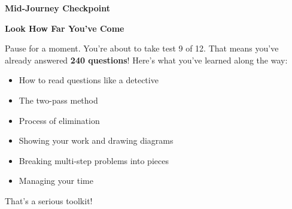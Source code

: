 \clearpage
\thispagestyle{empty}
{\sffamily

\begin{center}
{\fontsize{22}{26}\selectfont\bfseries\color{funBlue} \faMapMarkedAlt\hspace{3mm}Mid-Journey Checkpoint\hspace{3mm}\faMapMarkedAlt}

\vspace{2mm}
{\color{funGray}\hrulefill}
\end{center}

\vspace{3mm}

\begin{tcolorbox}[
    enhanced,
    colback=funBlueLight,
    colframe=funBlue!50,
    arc=10pt,
    boxrule=1.5pt,
    left=6mm, right=6mm, top=5mm, bottom=5mm,
]
{\large\bfseries\color{funBlueDark} \faCompass\hspace{2mm}Look How Far You've Come}

\vspace{2mm}

Pause for a moment. You're about to take test 9 of 12. That means you've already answered \textbf{240 questions}! Here's what you've learned along the way:

\vspace{3mm}

\begin{itemize}[leftmargin=6mm, itemsep=3pt]
    \item[\textcolor{funBlue}{\faStar}] How to read questions like a detective
    \item[\textcolor{funBlue}{\faStar}] The two-pass method
    \item[\textcolor{funBlue}{\faStar}] Process of elimination
    \item[\textcolor{funBlue}{\faStar}] Showing your work and drawing diagrams
    \item[\textcolor{funBlue}{\faStar}] Breaking multi-step problems into pieces
    \item[\textcolor{funBlue}{\faStar}] Managing your time
\end{itemize}

\vspace{2mm}

That's a serious toolkit!
\end{tcolorbox}

\vspace{3mm}

}
